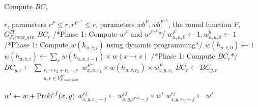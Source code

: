\begin{algorithm}
	\caption{Compute $BC_r$}
	\label{algo2}
	\begin{algorithmic}[1] %
		\Require $r$, parameters $r^F\leq r,r^{F^{-1}}\leq r$, parameters $wb^F,wb^{F^{-1}}$, the round function $F$, $G^{IT}_{F,max\_asn}$
		\Ensure $BC_r$
		\State /*Phase 1: Compute $w^F$ and $w^{F^{-1}}$*/
		\State $w^F_{u,u,0}\leftarrow 1,w^b_{u,u,0}\leftarrow 1$
		\EndFor
		\State {}
		\EndFor
		\State {}
		\EndFor
		\State /*Phase 1: Compute $w(h_{u,v,i})$ using dynamic programming*/
		\State $w(h_{u,v,0})\leftarrow 1$
		\EndFor
		\State $w(h_{u,v,i})\leftarrow \sum\limits_x w(h_{u,x,i-1})\times w(x\rightarrow v)$
		\EndFor
		\EndFor
		\State /*Phase 1: Compute $BC_r$*/
		\State $BC_{y,r}\leftarrow \sum\limits_{\substack{r_1+r_2+r_3=r\\u,v\in V^{IT}_{F,max\_asn}}}w^{F^{-1}}_{x,u,r_1}\times w(h_{u,v,r_2})\times w^F_{v,y,r_3}$
		\State $BC_r\leftarrow BC_{y,r}$
		\EndIf
		\EndFor
		\EndFor
		\EndProcedure
		
		\State $w'\leftarrow w+\text{Prob}^{rf}(x,y)$
		\State $w^{rf}_{s,y,r_{rf}-j}\leftarrow w^{rf}_{s,y,r^{r43}-j}\times w'$
		\Else
		\State $w^{rf}_{s,y,r_{rf}-j}\leftarrow w'$
		\EndIf
		\State {}
		\EndIf
		\EndFor

		\EndProcedure
	\end{algorithmic}
\end{algorithm}

